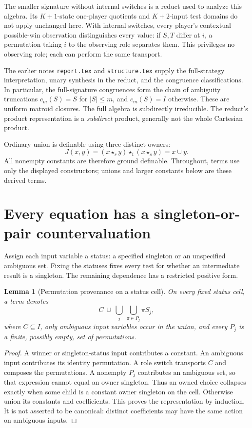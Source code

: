 \documentclass[11pt]{article}
\newtheorem{lemma}[theorem]{Lemma}
\newcommand{\ow}[1]{\mathbin{\star_{#1}}}
\begin{document}
The smaller signature without internal switches is a reduct used to
analyze this algebra. Its $K+1$-state one-player quotients and $K+2$-input
test domains do not apply unchanged here. With internal switches, every
player's contextual possible-win observation distinguishes every value:
if $S,T$ differ at $i$, a permutation taking $i$ to the observing role
separates them. This privileges no observing role; each can perform the
same transport.

The earlier notes \texttt{report.tex} and \texttt{structure.tex} supply
the full-strategy interpretation, unary synthesis in the reduct, and the
congruence classifications. In particular, the full-signature
congruences form the chain of ambiguity truncations
$c_m(S)=S$ for $|S|\leq m$, and $c_m(S)=I$ otherwise. These are uniform
matroid closures\cite{Oxley2011}. The full algebra is subdirectly
irreducible. The reduct's product representation is a \emph{subdirect}
product, generally not the whole Cartesian product.

Ordinary union is definable using three distinct owners:
\[
 J(x,y)=(x\ow r y)\ow t(x\ow s y)=x\cup y.
\]
All nonempty constants are therefore ground definable. Throughout, terms
use only the displayed constructors; unions and larger constants below
are these derived terms.

\section{Every equation has a singleton-or-pair countervaluation}

Assign each input variable a status: a specified singleton or an
unspecified ambiguous set. Fixing the statuses fixes every test for
whether an intermediate result is a singleton. The remaining dependence
has a restricted positive form.

\begin{lemma}[Permutation provenance on a status cell]\label{lem:provenance}
On every fixed status cell, a term denotes
\begin{equation}\label{eq:provenance}
 C\ \cup\ \bigcup_j\ \bigcup_{\pi\in P_j}\pi S_j,
\end{equation}
where $C\subseteq I$, only ambiguous input variables occur in the union,
and every $P_j$ is a finite, possibly empty, set of permutations.
\end{lemma}
\begin{proof}
A winner or singleton-status input contributes a constant. An ambiguous
input contributes its identity permutation. A role switch transports
$C$ and composes the permutations. A nonempty $P_j$ contributes an
ambiguous set, so that expression cannot equal an owner singleton. Thus
an owned choice collapses exactly when some child is a constant owner
singleton on the cell. Otherwise union its constants and coefficients.
This proves the representation by induction. It is not asserted to be
canonical: distinct coefficients may have the same action on ambiguous
inputs.
\end{proof}
\end{document}
